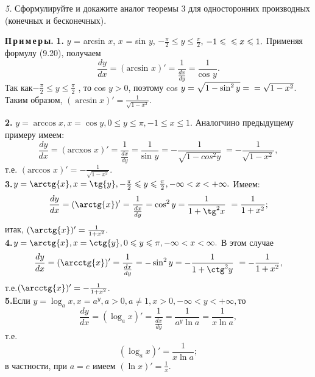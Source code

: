 \documentclass[a4paper,12pt]{article}
\begin{document}
\newpage
\setcounter{page}{293}
{\small\noindent\textit{5.} Сформулируйте и докажите аналог теоремы 3 для односторонних производных (конечных и бесконечных).}

{\textsf{\textbf{{П\,р\,и\,м\,е\,р\,ы.}}}} \textbf{1.}
$y$ = arcsin $x$, $x$ = sin $y$, 
{$-\frac{\pi}{2}\leqslant y\leqslant \frac{\pi}{2}$}, $-1 \leqslant\\ \leqslant x \leqslant 1.$ Применяя формулу (9.20), получаем
$$\frac{dy}{dx} =(\text{arcsin } x)' = \frac{1}{\frac{dx}{dy}} = \frac{1}{\text{cos } y}.$$
Так как{$-\frac{\pi}{2}\leqslant y\leqslant \frac{\pi}{2}$} , то cos $y>0$, поэтому cos $y = \sqrt{1-\sin^2y} = \\ = \sqrt{1-x^2}$. Таким образом, $(\arcsin{x})' = \frac{1}{ \sqrt{1-x^2}}$.

\textbf{2.} $y=\arccos{x}, x=\cos{y}, 0\leqslant y \leqslant \pi, -1\leqslant x \leqslant 1$. Аналогчино предыдущему примеру имеем:\\
{$$ \frac{dy}{dx} =( \text{arcxos }x)' = \frac{1}{\frac{dx}{dy}} = \frac{1}{\text{sin } y} = -\frac{1}{\sqrt{1 -cos^2y}} \ = -\frac{1}{\sqrt{1 -x^2}},  $$} т.е. $(\text{arccos } x)' = -\frac{1}{\sqrt{1 -x^2}}. $\\

\textbf{3.}$y= \arctg{x}, x= \tg{y}, -\frac{\pi}{2}\leqslant y\leqslant \frac{\pi}{2}, -\infty<x<+\infty.$ Имеем:
{$$ \frac{dy}{dx} =( \arctg{x})' = \frac{1}{\frac{dx}{dy}} = \cos^2{y} = \frac{1}{1 +\tg^2{x}} \ = \frac{1}{1 +x^2};  $$}
итак, $(\arctg{x})'= \frac{1}{1+x^2}.$\\

\textbf{4.}$y= \arctg{x}, x= \ctg{y}, 0\leqslant y\leqslant \pi, -\infty<x<\infty.$ В этом случае
{$$ \frac{dy}{dx} =( \arcctg{x})' = \frac{1}{\frac{dx}{dy}} = -\sin^2{y} = -\frac{1}{1+\ctg^2{y}} \ = -\frac{1}{1 +x^2},  $$} т.е.$(\arcctg{x})' = -\frac{1}{1 +x^2}$.\\

\textbf{5.}Если $y=\log_a{x}, x=a^y, a>0, a\ne 1, x>0, -\infty<y<+\infty, $то
$$ \frac{dy}{dx} = (\log_a{x})'= \frac{1}{\frac{dx}{dy}} = \frac{1}{a^y \ln{a}} = \frac{1}{x \ln{a}}, $$ т.е. 
$$(\log_a{x})' = \frac{1}{x \ln{a}};$$ в частности, при $a=e$ имеем $(\ln{x})'=\frac{1}{x}.$
\end{document}
